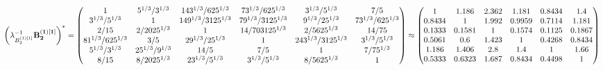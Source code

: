 \documentclass[10pt,a4paper]{article}
\begin{document}
	\[
		\left(\lambda_{B_2^{(1)[1]}}^{-1}\bold{B_2^{(1)[1]}}\right)^* = 
		\begin{pmatrix}
			{1}{} & {{5^ {1 / 3}}} / {{3^ {1 / 3}}} & {{14}{3^ {1 / 3}}} / {{625^ {1 / 3}}} & {{7}{3^ {1 / 3}}} / {{625^ {1 / 3}}} & {{3^ {1 / 3}}} / {{5^ {1 / 3}}} & {{7}} / {{5}} \\
			{{3^ {1 / 3}}} / {{5^ {1 / 3}}} & {1}{} & {{14}{9^ {1 / 3}}} / {{3125^ {1 / 3}}} & {{7}{9^ {1 / 3}}} / {{3125^ {1 / 3}}} & {{9^ {1 / 3}}} / {{25^ {1 / 3}}} & {{7}{3^ {1 / 3}}} / {{625^ {1 / 3}}} \\
			{{2}} / {{15}} & {{2}} / {{2025^ {1 / 3}}} & {1}{} & {{14}} / {{703125^ {1 / 3}}} & {{2}} / {{5625^ {1 / 3}}} & {{14}} / {{75}} \\
			{{81^ {1 / 3}}} / {{625^ {1 / 3}}} & {{3}} / {{5}} & {{2}{9^ {1 / 3}}} / {{25^ {1 / 3}}} & {1}{} & {{243^ {1 / 3}}} / {{3125^ {1 / 3}}} & {{3^ {1 / 3}}} / {{5^ {1 / 3}}} \\
			{{5^ {1 / 3}}} / {{3^ {1 / 3}}} & {{25^ {1 / 3}}} / {{9^ {1 / 3}}} & {{14}} / {{5}} & {{7}} / {{5}} & {1}{} & {{7}} / {{75^ {1 / 3}}} \\
			{{8}} / {{15}} & {{8}} / {{2025^ {1 / 3}}} & {{2}{3^ {1 / 3}}} / {{5^ {1 / 3}}} & {{3^ {1 / 3}}} / {{5^ {1 / 3}}} & {{8}} / {{5625^ {1 / 3}}} & {1}{} \\
		\end{pmatrix}
		\approx
		\begin{pmatrix}
			1        & 1.186    & 2.362    & 1.181    & 0.8434   & 1.4      \\
			0.8434   & 1        & 1.992    & 0.9959   & 0.7114   & 1.181    \\
			0.1333   & 0.1581   & 1        & 0.1574   & 0.1125   & 0.1867   \\
			0.5061   & 0.6      & 1.423    & 1        & 0.4268   & 0.8434   \\
			1.186    & 1.406    & 2.8      & 1.4      & 1        & 1.66     \\
			0.5333   & 0.6323   & 1.687    & 0.8434   & 0.4498   & 1        \\
		\end{pmatrix}
	\]
\end{document}

